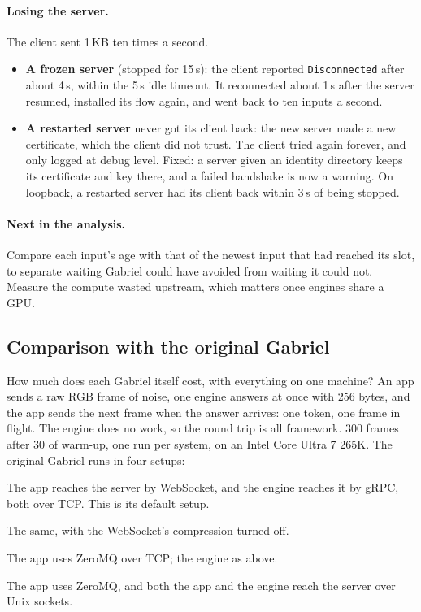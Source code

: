 \documentclass[11pt]{article}
\newcommand{\code}[1]{\texttt{#1}}
\begin{document}
\paragraph{Losing the server.} The client sent 1\,KB ten times a second.
\begin{itemize}[nosep]
  \item \textbf{A frozen server} (stopped for 15\,s): the client reported
        \code{Disconnected} after about 4\,s, within the 5\,s idle timeout. It reconnected
        about 1\,s after the server resumed, installed its flow again, and
        went back to ten inputs a second.
  \item \textbf{A restarted server} never got its client back: the new
        server made a new certificate, which the client did not trust. The
        client tried again forever, and only logged at debug level. Fixed:
        a server given an identity directory keeps its certificate and key
        there, and a failed handshake is now a warning. On loopback, a
        restarted server had its client back within 3\,s of being stopped.
\end{itemize}

\paragraph{Next in the analysis.} Compare each input's age with that of the
newest input that had reached its slot, to separate waiting Gabriel could
have avoided from waiting it could not. Measure the compute wasted upstream,
which matters once engines share a GPU.

\subsection{Comparison with the original Gabriel}

How much does each Gabriel itself cost, with everything on one machine? An
app sends a raw RGB frame of noise, one engine answers at once with 256
bytes, and the app sends the next frame when the answer arrives: one token,
one frame in flight. The engine does no work, so the round trip is all
framework. 300 frames after 30 of warm-up, one run per system, on an Intel
Core Ultra 7 265K. The original Gabriel runs in four setups:
\begin{description}[nosep, font=\normalfont\itshape]
  \item[WebSocket] The app reaches the server by WebSocket, and the engine
        reaches it by gRPC, both over TCP. This is its default setup.
  \item[WebSocket, uncompressed] The same, with the WebSocket's compression
        turned off.
  \item[ZeroMQ, TCP] The app uses ZeroMQ over TCP; the engine as above.
  \item[ZeroMQ, IPC] The app uses ZeroMQ, and both the app and the engine
        reach the server over Unix sockets.
\end{description}
\end{document}
